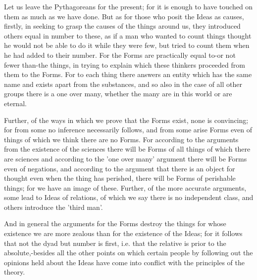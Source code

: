 \documentclass{article}
\begin{document}
Let us leave the Pythagoreans for the present; for it is enough to have touched on them as much as we have done. But as for those who posit the Ideas as causes, firstly, in seeking to grasp the causes of the things around us, they introduced others equal in number to these, as if a man who wanted to count things thought he would not be able to do it while they were few, but tried to count them when he had added to their number. For the Forms are practically equal to-or not fewer than-the things, in trying to explain which these thinkers proceeded from them to the Forms. For to each thing there answers an entity which has the same name and exists apart from the substances, and so also in the case of all other groups there is a one over many, whether the many are in this world or are eternal.

Further, of the ways in which we prove that the Forms exist, none is convincing; for from some no inference necessarily follows, and from some arise Forms even of things of which we think there are no Forms. For according to the arguments from the existence of the sciences there will be Forms of all things of which there are sciences and according to the 'one over many' argument there will be Forms even of negations, and according to the argument that there is an object for thought even when the thing has perished, there will be Forms of perishable things; for we have an image of these. Further, of the more accurate arguments, some lead to Ideas of relations, of which we say there is no independent class, and others introduce the 'third man'.

And in general the arguments for the Forms destroy the things for whose existence we are more zealous than for the existence of the Ideas; for it follows that not the dyad but number is first, i.e. that the relative is prior to the absolute,-besides all the other points on which certain people by following out the opinions held about the Ideas have come into conflict with the principles of the theory.
\end{document}

